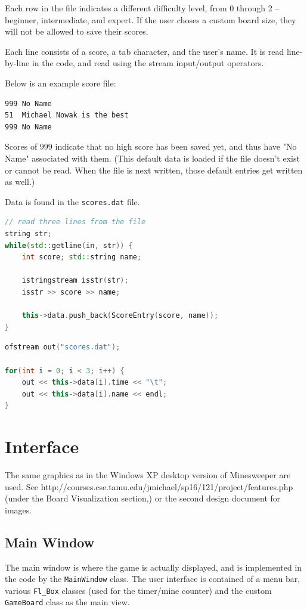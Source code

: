 \documentclass[11pt]{article}
\begin{document}
Each row in the file indicates a different difficulty level, from 0 through 2 -- beginner, intermediate, and expert. If the user choses a custom board size, they will not be allowed to save their scores.

Each line consists of a score, a tab character, and the user's name. It is read line-by-line in the code, and read using the stream input/output operators.

Below is an example score file:

\begin{lstlisting}[frame=single]
999	No Name
51	Michael Nowak is the best
999	No Name
\end{lstlisting}

Scores of $999$ indicate that no high score has been saved yet, and thus have "No Name" associated with them. (This default data is loaded if the file doesn't exist or cannot be read. When the file is next written, those default entries get written as well.)

Data is found in the \texttt{scores.dat} file.

\begin{lstlisting}[frame=single,language=C++]
// read three lines from the file
string str;
while(std::getline(in, str)) {
    int score; std::string name;

    istringstream isstr(str);
    isstr >> score >> name;

    this->data.push_back(ScoreEntry(score, name));
}
\end{lstlisting}


\begin{lstlisting}[frame=single,language=C++]
ofstream out("scores.dat");

for(int i = 0; i < 3; i++) {
    out << this->data[i].time << "\t";
    out << this->data[i].name << endl;
}
\end{lstlisting}

\pagebreak
\section{Interface}
The same graphics as in the Windows XP desktop version of Minesweeper are used. See http://courses.cse.tamu.edu/jmichael/sp16/121/project/features.php (under the Board Visualization section,) or the second design document for images.

\subsection{Main Window}
The main window is where the game is actually displayed, and is implemented in the code  by the \texttt{MainWindow} class. The user interface is contained of a menu bar, various \texttt{Fl\_Box} classes (used for the timer/mine counter) and the custom \texttt{GameBoard} class as the main view.
\end{document}
